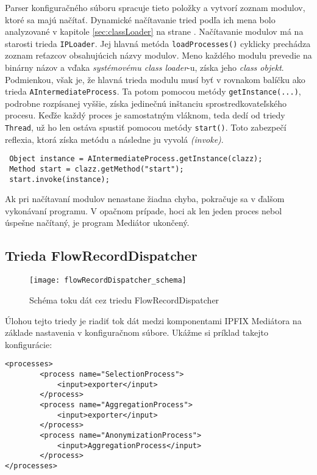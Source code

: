 Parser konfiguračného súboru spracuje tieto položky a vytvorí zoznam modulov, ktoré sa majú načítať.
Dynamické načítavanie tried podľa ich mena bolo analyzované v kapitole \ref{sec:classLoader} na strane
\pageref{sec:classLoader}. Načítavanie modulov má na starosti trieda \verb|IPLoader|. Jej hlavná metóda
\verb|loadProcesses()| cyklicky prechádza zoznam reťazcov obsahujúcich názvy modulov. Meno každého 
modulu prevedie na binárny názov a vďaka \emph{systémovému class loader}-u, získa jeho 
\emph{class objekt}. Podmienkou, však je, že hlavná trieda modulu musí byť v rovnakom balíčku ako trieda
\verb|AIntermediateProcess|. Ta potom pomocou metódy \verb|getInstance(...)|, podrobne rozpísanej vyššie, 
získa jedinečnú inštanciu sprostredkovateľského procesu. Keďže každý proces je samostatným vláknom, teda 
dedí od triedy \verb|Thread|, už ho len ostáva spustiť pomocou metódy \verb|start()|. Toto zabezpečí 
reflexia, ktorá získa metódu a následne ju vyvolá \emph{(invoke)}.
\begin{verbatim}
 Object instance = AIntermediateProcess.getInstance(clazz);
 Method start = clazz.getMethod("start");
 start.invoke(instance);
\end{verbatim}

Ak pri načítavaní modulov nenastane žiadna chyba, pokračuje sa v ďalšom vykonávaní programu. V opačnom 
prípade, hoci ak len jeden proces nebol úspešne načítaný, je program Mediátor ukončený.




\subsection{Trieda FlowRecordDispatcher} \label{sec:FlowRecordDispatcher}

\begin{figure}[ht!]
\centering
\texttt{[image: flowRecordDispatcher\_schema]}
\caption{Schéma toku dát cez triedu FlowRecordDispatcher}\label{o:flowRecordDispatcher_schema}
\end{figure}

Úlohou tejto triedy je riadiť tok dát medzi komponentami IPFIX Mediátora na základe nastavenia v 
konfiguračnom súbore.
Ukážme si príklad takejto konfigurácie:
\begin{verbatim}
<processes>
        <process name="SelectionProcess">
            <input>exporter</input>
        </process>
        <process name="AggregationProcess">
            <input>exporter</input>
        </process>
        <process name="AnonymizationProcess">
            <input>AggregationProcess</input>
        </process>
</processes>
\end{verbatim}

